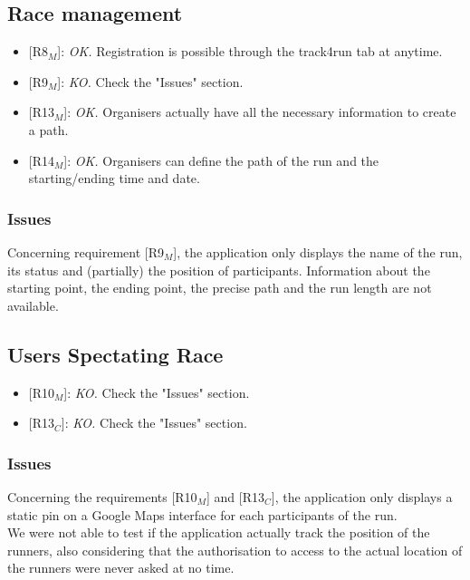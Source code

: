 \documentclass{article}
\begin{document}
\subsection{Race management}
\begin{itemize}
	\item {[R8$_M$]}: \textit{OK.} Registration is possible through the track4run tab at anytime.
	\item {[R9$_M$]}: \textit{KO.} Check the "Issues" section.
	\item {[R13$_M$]}: \textit{OK.} Organisers actually have all the necessary information to create a path.
	\item {[R14$_M$]}: \textit{OK.} Organisers can define the path of the run and the starting/ending time and date.
\end{itemize}

\subsubsection{Issues}
Concerning requirement {[R9$_M$]}, the application only displays the name of the run, its status and (partially) the position of participants. Information about the starting point, the ending point, the precise path and the run length are not available.

\subsection{Users Spectating Race}
\begin{itemize}
	\item {[R10$_M$]}: \textit{KO.} Check the "Issues" section.
	\item {[R13$_C$]}: \textit{KO.} Check the "Issues" section.
\end{itemize}

\subsubsection{Issues}
Concerning the requirements {[R10$_M$]} and {[R13$_C$]}, the application only displays a static pin on a Google Maps interface for each participants of the run. \\ We were not able to test if the application actually track the position of the runners, also considering that the authorisation to access to the actual location of the runners were never asked at no time.

\newpage
\end{document}
